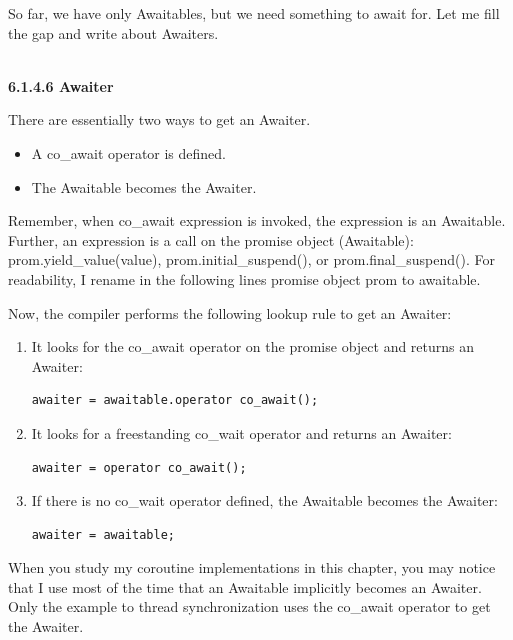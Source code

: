 So far, we have only Awaitables, but we need something to await for. Let me fill the gap and write about Awaiters.

\hspace*{\fill} \\ %
\noindent
\textbf{6.1.4.6\hspace{0.2cm} Awaiter}

There are essentially two ways to get an Awaiter.

\begin{itemize}
\item 
A co\_await operator is defined.

\item 
The Awaitable becomes the Awaiter.
\end{itemize}

Remember, when co\_await expression is invoked, the expression is an Awaitable. Further, an expression is a call on the promise object (Awaitable): prom.yield\_value(value), prom.initial\_suspend(), or prom.final\_suspend(). For readability, I rename in the following lines promise object prom to awaitable.

Now, the compiler performs the following lookup rule to get an Awaiter:

\begin{enumerate}
\item 
It looks for the co\_await operator on the promise object and returns an Awaiter:
\begin{lstlisting}[style=styleCXX]
awaiter = awaitable.operator co_await();
\end{lstlisting}

\item 
It looks for a freestanding co\_wait operator and returns an Awaiter:
\begin{lstlisting}[style=styleCXX]
awaiter = operator co_await();
\end{lstlisting}

\item 
If there is no co\_wait operator defined, the Awaitable becomes the Awaiter:
\begin{lstlisting}[style=styleCXX]
awaiter = awaitable;
\end{lstlisting}
\end{enumerate}

\begin{tcolorbox}[breakable,enhanced jigsaw,colback=blue!5!white,colframe=blue!75!black,title={awaiter = awaitable}]
When you study my coroutine implementations in this chapter, you may notice that I use most of the time that an Awaitable implicitly becomes an Awaiter. Only the example to thread synchronization uses the co\_await operator to get the Awaiter.
\end{tcolorbox}

